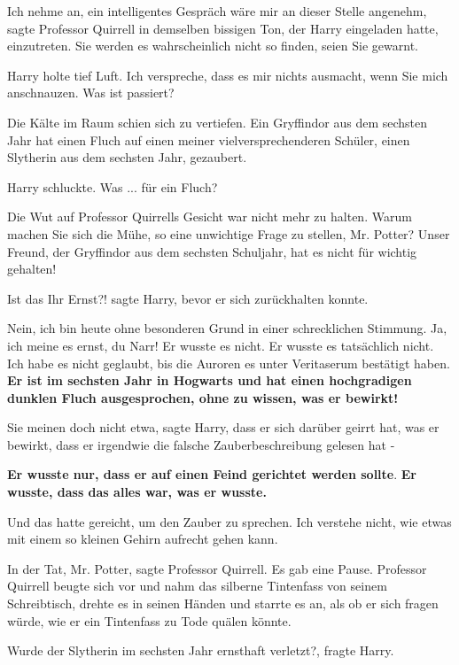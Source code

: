 \glqq{}Ich nehme an, ein intelligentes Gespräch wäre mir an dieser Stelle
angenehm\grqq{}, sagte Professor Quirrell in demselben bissigen Ton, der Harry
eingeladen hatte, einzutreten. \glqq{}Sie werden es wahrscheinlich nicht so
finden, seien Sie gewarnt.\grqq{}

Harry holte tief Luft. \glqq{}Ich verspreche, dass es mir nichts ausmacht, wenn
Sie mich anschnauzen. Was ist passiert?\grqq{}

Die Kälte im Raum schien sich zu vertiefen. \glqq{}Ein Gryffindor aus dem
sechsten Jahr hat einen Fluch auf einen meiner vielversprechenderen Schüler,
einen Slytherin aus dem sechsten Jahr, gezaubert.\grqq{}

Harry schluckte. \glqq{}Was ... für ein Fluch?\grqq{}

Die Wut auf Professor Quirrells Gesicht war nicht mehr zu halten. \glqq{}Warum
machen Sie sich die Mühe, so eine unwichtige Frage zu stellen, Mr. Potter? Unser
Freund, der Gryffindor aus dem sechsten Schuljahr, hat es nicht für wichtig
gehalten!\grqq{}

\glqq{}Ist das Ihr Ernst?!\grqq{} sagte Harry, bevor er sich zurückhalten konnte.

\glqq{}Nein, ich bin heute ohne besonderen Grund in einer schrecklichen Stimmung.
Ja, ich meine es ernst, du Narr! Er wusste es nicht. Er wusste es tatsächlich
nicht. Ich habe es nicht geglaubt, bis die Auroren es unter Veritaserum
bestätigt haben. \textbf{Er ist im sechsten Jahr in Hogwarts und hat einen
hochgradigen dunklen Fluch ausgesprochen, ohne zu wissen, was er
bewirkt!}\grqq{}

\glqq{}Sie meinen doch nicht etwa\grqq{}, sagte Harry, \glqq{}dass er sich darüber
geirrt hat, was er bewirkt, dass er irgendwie die falsche Zauberbeschreibung
gelesen hat -\grqq{}

\glqq{}\textbf{Er wusste nur, dass er auf einen Feind gerichtet werden
sollte}.\textbf{ Er wusste, dass das alles war, was er wusste.}\grqq{}

Und das hatte gereicht, um den Zauber zu sprechen. \glqq{}Ich verstehe nicht, wie
etwas mit einem so kleinen Gehirn aufrecht gehen kann.\grqq{}

\glqq{}In der Tat, Mr. Potter\grqq{}, sagte Professor Quirrell. Es gab eine
Pause. Professor Quirrell beugte sich vor und nahm das silberne Tintenfass von
seinem Schreibtisch, drehte es in seinen Händen und starrte es an, als ob er
sich fragen würde, wie er ein Tintenfass zu Tode quälen könnte.

\glqq{}Wurde der Slytherin im sechsten Jahr ernsthaft verletzt?\grqq{}, fragte
Harry.

